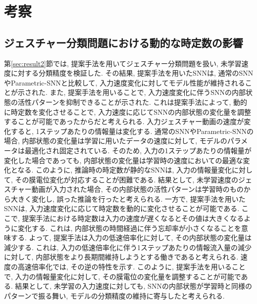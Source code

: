 \section{考察}
\subsection{ジェスチャー分類問題における動的な時定数の影響}
第\ref{sec:result2}節では, 提案手法を用いてジェスチャー分類問題を扱い, 未学習速度に対する分類精度を検証した.
その結果, 提案手法を用いたSNNは, 通常のSNNやParametric-SNNと比較して, 入力速度変化に対してモデル性能が維持されることが示された.
また, 提案手法を用いることで, 入力速度変化に伴うSNNの内部状態の活性パターンを抑制できることが示された.
これは提案手法によって, 動的に時定数を変化させることで, 入力速度に応じてSNNの内部状態の変化量を調整することが可能であったからだと考えられる.
入力ジェスチャー動画の速度が変化すると, 1ステップあたりの情報量は変化する.
通常のSNNやParametric-SNNの場合, 内部状態の変化量は学習に用いたデータの速度に対して, モデルのパラメータは最適化され固定されている.
そのため, 入力の1ステップあたりの情報量が変化した場合であっても, 内部状態の変化量は学習時の速度においての最適な変化となる.
このように, 推論時の時定数が静的なSNNは, 入力の情報量変化に対して, その膜電位変化が対応することが困難である.
結果として, 未学習速度のジェスチャー動画が入力された場合, その内部状態の活性パターンは学習時のものから大きく変化し, 誤った推論を行ったと考えられる.
一方で, 提案手法を用いたSNNは, 入力速度変化に応じて時定数を動的に変化させることが可能である.
ここで, 提案手法における時定数は入力の速度が遅くなるとその値は大きくなるように変化する.
これは, 内部状態の時間経過に伴う忘却率が小さくなることを意味する.
よって, 提案手法は入力の低速倍率化に対して, その内部状態の変化量は減少する.
これは, 入力の低速倍率化に伴う1ステップあたりの情報流入量の減少に対して, 内部状態をより長期間維持しようとする働きであると考えられる.
速度の高速倍率化では, その逆の特性を示す.
このように, 提案手法を用いることで, 入力の情報量変化に対して, その膜電位の変化量を調整することが可能である.
結果として, 未学習の入力速度に対しても, SNNの内部状態が学習時と同様のパターンで振る舞い, モデルの分類精度の維持に寄与したと考えられる.
\clearpage
